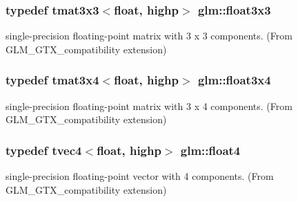 \hypertarget{group__gtx__compatibility_ga75c991509a4c4894f10ab480f89e39e7}{}
\subsubsection[{float3x3}]{\setlength{\rightskip}{0pt plus 5cm}typedef tmat3x3$<$float, highp$>$ {\bf glm\+::float3x3}}\label{group__gtx__compatibility_ga75c991509a4c4894f10ab480f89e39e7}


single-\/precision floating-\/point matrix with 3 x 3 components. (From G\+L\+M\+\_\+\+G\+T\+X\+\_\+compatibility extension) 

\hypertarget{group__gtx__compatibility_gadbca4a528b4ef17b78afe91c00420087}{}
\subsubsection[{float3x4}]{\setlength{\rightskip}{0pt plus 5cm}typedef tmat3x4$<$float, highp$>$ {\bf glm\+::float3x4}}\label{group__gtx__compatibility_gadbca4a528b4ef17b78afe91c00420087}


single-\/precision floating-\/point matrix with 3 x 4 components. (From G\+L\+M\+\_\+\+G\+T\+X\+\_\+compatibility extension) 

\hypertarget{group__gtx__compatibility_ga05e1940d91deb4bbe819881bf65dc52d}{}
\subsubsection[{float4}]{\setlength{\rightskip}{0pt plus 5cm}typedef tvec4$<$float, highp$>$ {\bf glm\+::float4}}\label{group__gtx__compatibility_ga05e1940d91deb4bbe819881bf65dc52d}


single-\/precision floating-\/point vector with 4 components. (From G\+L\+M\+\_\+\+G\+T\+X\+\_\+compatibility extension) 

\hypertarget{group__gtx__compatibility_ga4cb477bf8e9167ab065aa70c7767e329}{}
